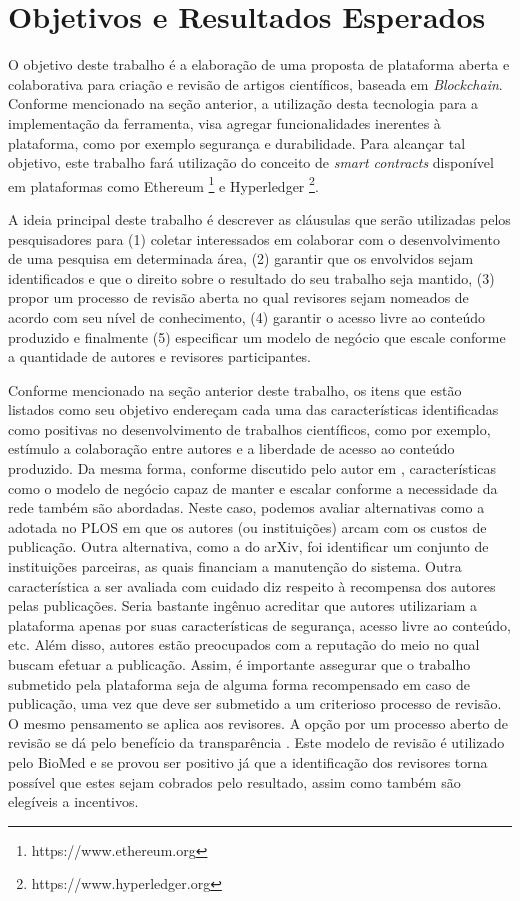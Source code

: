 \chapter{Objetivos e Resultados Esperados}
O objetivo deste trabalho é a elaboração de uma proposta de plataforma aberta e colaborativa para criação e revisão de artigos científicos, baseada em \textit{Blockchain}. Conforme mencionado na seção anterior, a utilização desta tecnologia para a implementação da ferramenta, visa agregar funcionalidades inerentes à plataforma, como por exemplo segurança e durabilidade. Para alcançar tal objetivo, este trabalho fará utilização do conceito de \textit{smart contracts} disponível em plataformas como Ethereum \footnote{https://www.ethereum.org} e Hyperledger \footnote{https://www.hyperledger.org}.

A ideia principal deste trabalho é descrever as cláusulas que serão utilizadas pelos pesquisadores para (1) coletar interessados em colaborar com o desenvolvimento de uma pesquisa em determinada área, (2) garantir que os envolvidos sejam identificados e que o direito sobre o resultado do seu trabalho seja mantido, (3) propor um processo de revisão aberta no qual revisores sejam nomeados de acordo com seu nível de conhecimento, (4) garantir o acesso livre ao conteúdo produzido e finalmente (5) especificar um modelo de negócio que escale conforme a quantidade de autores e revisores participantes. 

Conforme mencionado na seção anterior deste trabalho, os itens que estão listados como seu objetivo endereçam cada uma das características identificadas como positivas no desenvolvimento de trabalhos científicos, como por exemplo, estímulo a colaboração entre autores e a liberdade de acesso ao conteúdo produzido. Da mesma forma, conforme discutido pelo autor em \cite{OpenAccessAnalysis2004}, características como o modelo de negócio capaz de manter e escalar conforme a necessidade da rede também são abordadas. Neste caso, podemos avaliar alternativas como a adotada no PLOS em que os autores (ou instituições) arcam com os custos de publicação. Outra alternativa, como a do arXiv, foi identificar um conjunto de instituições parceiras, as quais financiam a manutenção do sistema. Outra característica a ser avaliada com cuidado diz respeito à recompensa dos autores pelas publicações. Seria bastante ingênuo acreditar que autores utilizariam a plataforma apenas por suas características de segurança, acesso livre ao conteúdo, etc. Além disso, autores estão preocupados com a reputação do meio no qual buscam efetuar a publicação. Assim, é importante assegurar que o trabalho submetido pela plataforma seja de alguma forma recompensado em caso de publicação, uma vez que deve ser submetido a um criterioso processo de revisão. O mesmo pensamento se aplica aos revisores. A opção por um processo aberto de revisão se dá pelo benefício da transparência \cite{InteractivePeerReview2010}. Este modelo de revisão é utilizado pelo BioMed e se provou ser positivo já que a identificação dos revisores torna possível que estes sejam cobrados pelo resultado, assim como também são elegíveis a incentivos.

